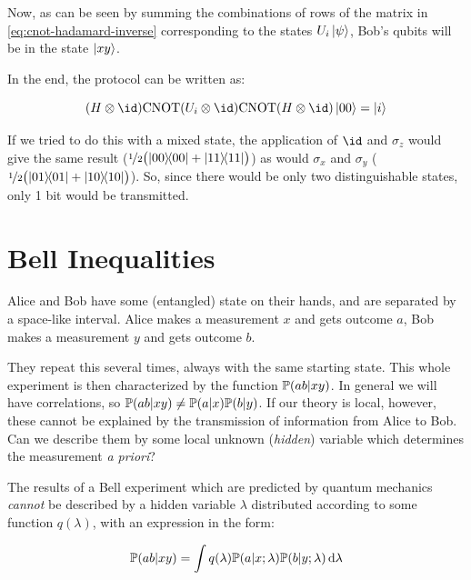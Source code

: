 \documentclass[main.tex]{subfiles}
\begin{document}
Now, as can be seen by summing the combinations of rows of the matrix in \eqref{eq:cnot-hadamard-inverse} corresponding to the states \(U_i \ket{\psi} \), Bob's qubits will be in the state \(\ket{xy} \).

In the end, the protocol can be written as:

\begin{equation}
    (H \otimes \id)
    \text{CNOT}
    (U_i \otimes \id)
    \text{CNOT}
    (H \otimes \id)
    \ket{00}
    = \ket{i}
\end{equation}

\begin{bluebox}
  If we tried to do this with a mixed state, the application of \(\id\) and \(\sigma_z\) would give the same result (\(\frac[i]{1}{2} \qty(\dyad{00} +\dyad{11} )\)) as would \(\sigma_x\) and \(\sigma_y\) (\(\frac[i]{1}{2} \qty(\dyad{01} +\dyad{10} )\)). So, since there would be only two distinguishable states, only 1 bit would be transmitted.
\end{bluebox}

\section{Bell Inequalities} \label{sec:bell-inequalities}

Alice and Bob have some (entangled) state on their hands, and are separated by a space-like interval. Alice makes a measurement \(x\) and gets outcome \(a\), Bob makes a measurement \(y\) and gets outcome \(b\).

They repeat this several times, always with the same starting state. This whole experiment is then characterized by the function \(\P (ab | xy)\). In general we will have correlations, so \(\P (ab | xy) \neq \P(a|x) \P (b|y)\). If our theory is local, however, these cannot be explained by the transmission of information from Alice to Bob. Can we describe them by some local unknown (\emph{hidden}) variable which determines the measurement \emph{a priori}?

\begin{claim}
The results of a Bell experiment which are predicted by quantum mechanics \emph{cannot} be described by a hidden variable \(\lambda\) distributed according to some function \(q(\lambda)\), with an expression in the form:

\begin{equation} \label{eq:local-hidden-parameter}
    \P(ab | xy) = \int q(\lambda) \P(a|x; \lambda) \P (b|y; \lambda)  \dd{\lambda}
\end{equation}
\end{claim}
\end{document}
